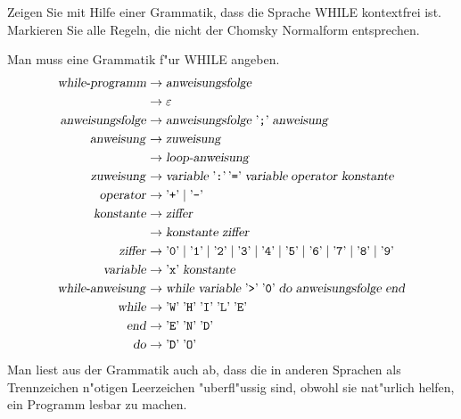 Zeigen Sie mit Hilfe einer Grammatik, dass die Sprache WHILE kontextfrei ist.
Markieren Sie alle Regeln, die nicht der Chomsky Normalform entsprechen.

\begin{loesung}
Man muss eine Grammatik f"ur WHILE angeben.
\begin{align*}
\text{\textsl{while-programm}}&\to\text{\textsl{anweisungsfolge}}\\
&\to\varepsilon\\
\text{\textsl{anweisungsfolge}}
&\to\text{\textsl{anweisungsfolge}}\;\text{'{\tt ;}'}\;
\text{\textsl{anweisung}}
\\
\text{\textsl{anweisung}}
&\to\text{\textsl{zuweisung}}
\\
&\to\text{\textsl{loop-anweisung}}
\\
\text{\textsl{zuweisung}}
&\to
\text{\textsl{variable}}\; \text{'{\tt :}'}\, \text{'{\tt =}'}\;
\textsl{variable}\;\text{\textsl{operator}}\;\text{\textsl{konstante}}
\\
\text{\textsl{operator}}
&\to\text{'{\tt +}'}\;|\;\text{'{\tt -}'}
\\
\text{\textsl{konstante}}&\to\text{\textsl{ziffer}}\\
&\to\text{\textsl{konstante}}\;\text{\textsl{ziffer}}
\\
\text{\textsl{ziffer}}&\to 
\text{'{\tt 0}'}\;|\;
\text{'{\tt 1}'}\;|\;
\text{'{\tt 2}'}\;|\;
\text{'{\tt 3}'}\;|\;
\text{'{\tt 4}'}\;|\;
\text{'{\tt 5}'}\;|\;
\text{'{\tt 6}'}\;|\;
\text{'{\tt 7}'}\;|\;
\text{'{\tt 8}'}\;|\;
\text{'{\tt 9}'}\\
\text{\textsl{variable}}&\to \text{'{\tt x}'}\;\text{\textsl{konstante}}\\
\text{\textsl{while-anweisung}}&\to
\text{\textsl{while}}\;
\text{\textsl{variable}}\;
\text{'{\tt >}'}\;
\text{'{\tt 0}'}\;
\text{\textsl{do}}\;
\text{\textsl{anweisungsfolge}}\;
\text{\textsl{end}}\\
\text{\textsl{while}}&\to
\text{'{\tt W}'}\; \text{'{\tt H}'}\; \text{'{\tt I}'}\; \text{'{\tt L}'}\; \text{'{\tt E}'}\\
\text{\textsl{end}}&\to \text{'{\tt E}'}\; \text{'{\tt N}'}\; \text{'{\tt D}'}\\
\text{\textsl{do}}&\to \text{'{\tt D}'}\; \text{'{\tt O}'} \\
\end{align*}
Man liest aus der Grammatik auch ab, dass die in anderen Sprachen als
Trennzeichen n"otigen Leerzeichen "uberfl"ussig sind, obwohl sie nat"urlich
helfen, ein Programm lesbar zu machen.


\end{loesung}
